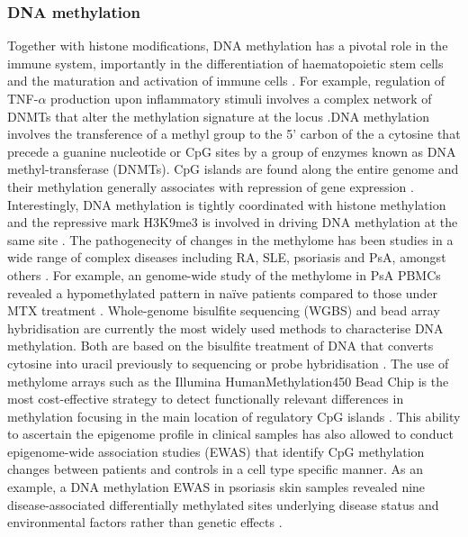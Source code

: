 \subsubsection{DNA methylation}
Together with histone modifications, DNA methylation has a pivotal role in the immune system, importantly in the differentiation of haematopoietic stem cells and  the maturation and activation of immune cells \parencite{Sellars2015,Lai2013}. For example, regulation of TNF-$\alpha$ production upon inflammatory stimuli involves a complex network of DNMTs that alter the methylation signature at the locus \parencite{Sullivan2007}.DNA methylation involves the transference of a methyl group %
to the 5' carbon of the a cytosine that precede a guanine nucleotide or CpG sites by a group of enzymes known as DNA methyl-transferase (DNMTs). CpG islands are found along the entire genome and their methylation generally associates with repression of gene expression \parencite{Herman2003}. Interestingly, DNA methylation is tightly coordinated with histone methylation and the repressive mark H3K9me3 is involved in driving DNA methylation at the same site \parencite{Rottach2009}. 
The pathogenecity of changes in the methylome has been studies in a wide range of complex diseases including RA, SLE, psoriasis and PsA, amongst others \parencite{Lei2009,Liu2013,Zhang2010}. For example, an genome-wide study of the methylome in PsA PBMCs revealed a hypomethylated pattern in na\"{i}ve patients compared to those under MTX treatment \parencite{Kim1996}.
Whole-genome bisulfite sequencing (WGBS) and bead array hybridisation are currently the most widely used methods to characterise DNA methylation. Both are based on the bisulfite treatment of DNA that converts cytosine into uracil previously to sequencing or probe hybridisation \parencite{Frommer1992,Miura2014,Dedeurwaerder2013}. The use of methylome arrays such as the Illumina HumanMethylation450 Bead Chip is the most cost-effective strategy to detect functionally relevant differences in methylation focusing in the main location of regulatory CpG islands \parencite{Tserel2015,Bonder2017}. This ability to ascertain the epigenome profile in clinical samples has also allowed to conduct epigenome-wide association studies (EWAS) that identify CpG methylation changes between patients and controls in a cell type specific manner. As an example, a DNA methylation EWAS in psoriasis skin samples revealed nine disease-associated differentially methylated sites underlying disease status and environmental factors rather than genetic effects \parencite{Zhou2016}.

